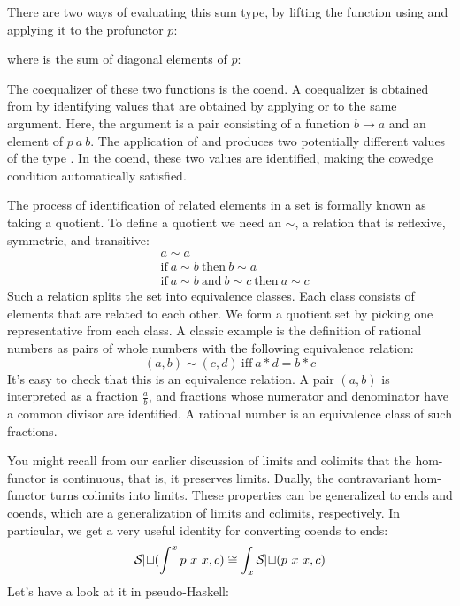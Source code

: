 There are two ways of evaluating this sum type, by lifting the function
using  and applying it to the profunctor $p$:

where  is the sum of diagonal elements of $p$:

The coequalizer of these two functions is the coend. A coequalizer is
obtained from  by identifying values that are
obtained by applying  or  to the same
argument. Here, the argument is a pair consisting of a function
$b \to a$ and an element of $p\ a\ b$. The
application of  and  produces two potentially
different values of the type . In the coend, these
two values are identified, making the cowedge condition automatically
satisfied.

The process of identification of related elements in a set is formally
known as taking a quotient. To define a quotient we need an
 $\sim$, a relation that
is reflexive, symmetric, and transitive:
\begin{align*}
&a \sim a \\
&\text{if}\ a \sim b\ \text{then}\ b \sim a \\
&\text{if}\ a \sim b\ \text{and}\ b \sim c\ \text{then}\ a \sim c
\end{align*}
Such a relation splits the set into equivalence classes. Each class
consists of elements that are related to each other. We form a quotient
set by picking one representative from each class. A classic example is
the definition of rational numbers as pairs of whole numbers with the
following equivalence relation:
\[(a, b) \sim (c, d)\ \text{iff}\ a * d = b * c\]
It's easy to check that this is an equivalence relation. A pair
$(a, b)$ is interpreted as a fraction $\frac{a}{b}$, and
fractions whose numerator and denominator have a common divisor are identified. A rational number
is an equivalence class of such fractions.

You might recall from our earlier discussion of limits and colimits that
the hom-functor is continuous, that is, it preserves limits. Dually, the
contravariant hom-functor turns colimits into limits. These properties
can be generalized to ends and coends, which are a generalization of
limits and colimits, respectively. In particular, we get a very useful
identity for converting coends to ends:
\[\Set(\int^x p\ x\ x, c) \cong \int_x \Set(p\ x\ x, c)\]
Let's have a look at it in pseudo-Haskell:

